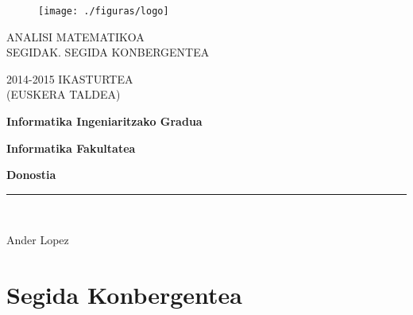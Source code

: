 

\begin{titlepage}

\begin{center}
\vspace*{-1in}
\begin{figure}[htb]
\begin{center}
\texttt{[image: ./figuras/logo]}
\end{center}
\end{figure}

ANALISI MATEMATIKOA\\
\vspace*{1.15in}
SEGIDAK. SEGIDA KONBERGENTEA\\
\vspace*{0.6in}
\begin{large}
2014-2015 IKASTURTEA\\
\vspace*{0.15in}
(EUSKERA TALDEA)\\
\end{large}
\vspace*{1.2in}
\begin{Large}
\textbf{Informatika Ingeniaritzako Gradua} \\
\end{Large}
\begin{Large}
\textbf{Informatika Fakultatea} \\
\end{Large}
\begin{Large}
\textbf{Donostia} \\
\end{Large}
\vspace*{2.3in}
\vspace*{0.3in}
\rule{80mm}{0.1mm}\\
\vspace*{0.1in}
\begin{large}
Ander Lopez \\
\end{large}
\end{center}

\end{titlepage}


\section{Segida Konbergentea}

